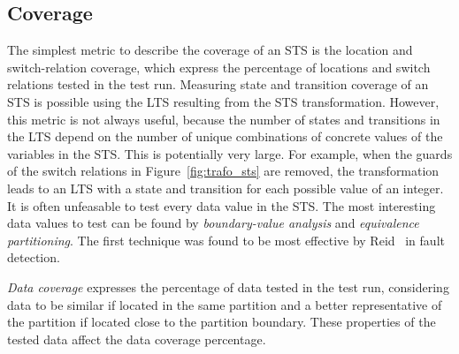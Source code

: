 \subsection{Coverage}\label{sec:sts_coverage}
The simplest metric to describe the coverage of an STS is the location and switch-relation coverage, which express the percentage of locations and switch relations tested in the test run. Measuring state and transition coverage of an STS is possible using the LTS resulting from the STS transformation. However, this metric is not always useful, because the number of states and transitions in the LTS depend on the number of unique combinations of concrete values of the variables in the STS. This is potentially very large. For example, when the guards of the switch relations in Figure~\ref{fig:trafo_sts} are removed, the transformation leads to an LTS with a state and transition for each possible value of an integer. It is often unfeasable to test every data value in the STS. The most interesting data values to test can be found by \textit{boundary-value analysis} and \textit{equivalence partitioning}. The first technique was found to be most effective by Reid~\cite{Reid:partitioning} in fault detection.

\textit{Data coverage} expresses the percentage of data tested in the test run, considering data to be similar if located in the same partition and a better representative of the partition if located close to the partition boundary. These properties of the tested data affect the data coverage percentage.
